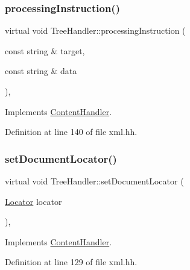 \subsubsection{\texorpdfstring{processingInstruction()}{processingInstruction()}}
{\footnotesize\ttfamily virtual void Tree\+Handler\+::processing\+Instruction (\begin{DoxyParamCaption}\item[{const string \&}]{target,  }\item[{const string \&}]{data }\end{DoxyParamCaption})\hspace{0.3cm}{\ttfamily [inline]}, {\ttfamily [virtual]}}



Implements \mbox{\hyperlink{class_content_handler_a6b3929cb92630d4535b63f6470ff3020}{Content\+Handler}}.



Definition at line 140 of file xml.\+hh.

\mbox{\label{class_tree_handler_af72fb7d4af5500674084e45076b261af}} 
\subsubsection{\texorpdfstring{setDocumentLocator()}{setDocumentLocator()}}
{\footnotesize\ttfamily virtual void Tree\+Handler\+::set\+Document\+Locator (\begin{DoxyParamCaption}\item[{\mbox{\hyperlink{xml_8hh_ad34bc338f5e298a1993320898263b741}{Locator}}}]{locator }\end{DoxyParamCaption})\hspace{0.3cm}{\ttfamily [inline]}, {\ttfamily [virtual]}}



Implements \mbox{\hyperlink{class_content_handler_aceaa6046b41a125ee4718fdbb009b859}{Content\+Handler}}.



Definition at line 129 of file xml.\+hh.

\mbox{\label{class_tree_handler_a9cd7a58c26881b5301d6f0b04f9a1c7f}} 
